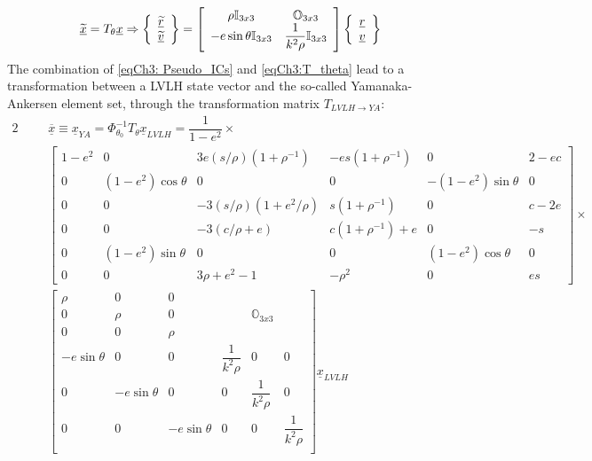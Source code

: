 		\begin{equation}
		\underline{\widetilde{x}} = T_{\theta} \underline{x} \Rightarrow
		\left\{
		\begin{array}{c}
		\underline{\widetilde{r}}\\
		\underline{\widetilde{v}}
		\end{array}
		\right\}
		= \left[
		\begin{array}{cc}
		\rho \mathbb{I}_{3x3} 			& \mathbb{O}_{3x3} \\
		-e \sin\theta \mathbb{I}_{3x3} 	& \dfrac{1}{k^2 \rho} \mathbb{I}_{3x3} 
		\end{array}
		\right]
		\left\{
		\begin{array}{c}
		\underline{r}\\
		\underline{v}
		\end{array}
		\right\}
		\label{eqCh3:T_theta}
		\end{equation}
		\indent The combination of \eqref{eqCh3: Pseudo_ICs} and \eqref{eqCh3:T_theta} lead to a transformation between a LVLH state vector and the so-called Yamanaka-Ankersen element set, through the transformation matrix $T_{LVLH\to YA}$:
		\begin{alignat}{2}
		&\nonumber && \underline{\overline{x}} \equiv \underline{x}_{YA} = \Phi_{\theta_0}^{-1} T_{\theta} \underline{x}_{LVLH} = \dfrac{1}{1 - e^2} \times \\
		&\nonumber && \left[
		\begin{array}{cccccc}
		1 - e^2	&    0 					&  3 e  (s/\rho)  (1 + \rho^{-1})		& -e s  (1 + \rho^{-1})	&    0						&                 2 - e c\\
        0		&  (1 - e^2) \cos\theta	&         0							&                 0		&  -(1 - e^2) \sin\theta 	&              0\\
        0 		&  	0					&     -3  (s/\rho)  (1 + e^2/\rho)	&   s  (1 + \rho^{-1})	&    0						&              c - 2e	\\
        0		&    0					&          -3  (c/\rho + e)			&  c  (1 + \rho^{-1}) + e	&    0						&      -s 		\\
        0		& (1 - e^2) \sin\theta 	&                0 					&                 0		&  (1 - e^2) \cos\theta 	&                              0\\
        0		&	0 					&             3  \rho + e^2 - 1		&           -\rho^2 	&    0						& e s
		\end{array}
		\right] \times\\
		&\label{eqCh3:LVLH2YA}&&
		\left[
		\begin{array}{cccccc}
		\rho  			& 0 			& 0 			&  						&  						&  	\\
		0 				& \rho 			& 0 			& 						& \mathbb{O}_{3x3} 		&  	\\
		0  				& 0 			& \rho 			&  						&  						&  	\\
		-e \sin\theta  	& 0 			& 0 			& \dfrac{1}{k^2 \rho} 	& 0 					& 0 \\
		0  				& -e \sin\theta & 0 			& 0 					& \dfrac{1}{k^2 \rho} 	& 0 \\
		0  				& 0 			& -e \sin\theta	& 0 					& 0 					& \dfrac{1}{k^2 \rho} \\
		\end{array}
		\right]
		\underline{x}_{LVLH}
		\end{alignat}
